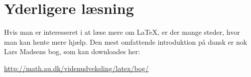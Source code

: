 \documentclass[a4paper,12pt,oneside,article]{memoir}
\begin{document}
\chapter*{Yderligere læsning}
Hvis man er interesseret i at læse mere om \LaTeX, er der mange steder, hvor man kan hente mere hjælp. Den mest omfattende introduktion på dansk er nok Lars Madsens bog, som kan downloades her:
\begin{center}
	\url{http://math.au.dk/videnudveksling/latex/bog/}
\end{center}

\end{document}
